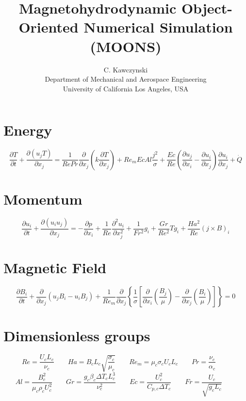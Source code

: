 \documentclass[11pt]{article}
\begin{document}
\doublespacing
\title{Magnetohydrodynamic Object-Oriented Numerical Simulation (MOONS)}
\author{C. Kawczynski \\
Department of Mechanical and Aerospace Engineering \\
University of California Los Angeles, USA\\}
\section{Energy}
\Large
\begin{equation}
	\frac{\partial T}{\partial t} +
	\frac{\partial (u_j T)}{\partial x_j}
	= 
	\frac{1}{Re Pr}
	\frac{\partial}{\partial x_j}
	\left( 
	k \frac{\partial T}{\partial x_j}
	\right) + 
	Re_m Ec Al
	\frac{{j}^2}{\sigma} +
	\frac{Ec}{Re}
	\left(
	\frac{\partial u_j}{\partial x_i}
	-
	\frac{\partial u_i}{\partial x_j}
	\right)
	\frac{\partial u_i}{\partial x_j} +
	\dot{Q}
\end{equation}
\section{Momentum}
\begin{equation}
	\frac{\partial u_i}{\partial t} + 
	\frac{\partial (u_i u_j)}{\partial x_j}
	= 
	- \frac{\partial p}{\partial x_i}
	+ \frac{1}{Re}
	\frac{\partial^2 u_i}{\partial x_j^2}
	+ \frac{1}{Fr^2}
	g_i
	+ \frac{Gr}{Re^2}
	T g_i
	+ \frac{Ha^2}{Re}
	(j \times B)_i
\end{equation}
\section{Magnetic Field}
\begin{equation}
	\frac{\partial B_i}{\partial t} 
	+ \frac{\partial}{\partial x_j} (u_j B_i - u_i B_j) 
	+ \frac{1}{Re_m}
	\frac{\partial}{\partial x_j} 
	\left\{ \frac{1}{\sigma} 
	\left[ 
	\frac{\partial}{\partial x_i} 
	\left( \frac{B_j}{\mu} \right) - 
	\frac{\partial}{\partial x_j} 
	\left( \frac{B_i}{\mu} \right)
	\right]
	\right\} = 0
\end{equation}

\section{Dimensionless groups}
\begin{equation}
	Re = \frac{U_c L_c}{\nu_c} \qquad
	Ha = B_c L_c \sqrt{\frac{\sigma_c}{\mu_c}} \qquad
	Re_m = \mu_c \sigma_c U_c L_c \qquad
	Pr = \frac{\nu_c}{\alpha_c} \qquad
\end{equation}
\begin{equation}
	Al = \frac{B_c^2}{\mu_c \rho_c U_c^2} \qquad
	Gr = \frac{g_c \beta_c \Delta T_c L_c^3}{\nu_c^2} \qquad
	Ec = \frac{U_c^2}{C_{p,c} \Delta T_c} \qquad
	Fr = \frac{U_c}{\sqrt{g_c L_c}} \qquad
\end{equation}
\end{document}
